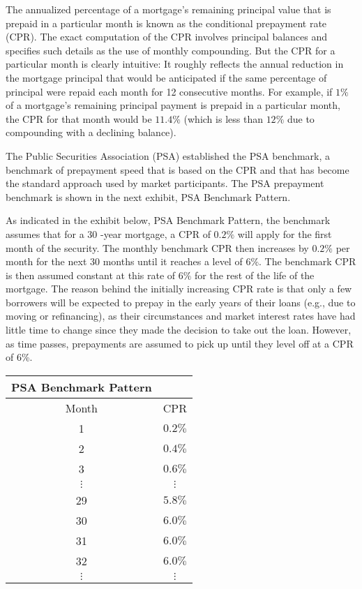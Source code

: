 \documentclass[11pt]{article}
\begin{document}
The annualized percentage of a mortgage's remaining principal value that is prepaid in a particular month is known as the conditional prepayment rate (CPR). The exact computation of the CPR involves principal balances and specifies such details as the use of monthly compounding. But the CPR for a particular month is clearly intuitive: It roughly reflects the annual reduction in the mortgage principal that would be anticipated if the same percentage of principal were repaid each month for 12 consecutive months. For example, if $1 \%$ of a mortgage's remaining principal payment is prepaid in a particular month, the CPR for that month would be $11.4 \%$ (which is less than $12 \%$ due to compounding with a declining balance).

The Public Securities Association (PSA) established the PSA benchmark, a benchmark of prepayment speed that is based on the CPR and that has become the standard approach used by market participants. The PSA prepayment benchmark is shown in the next exhibit, PSA Benchmark Pattern.

As indicated in the exhibit below, PSA Benchmark Pattern, the benchmark assumes that for a 30 -year mortgage, a CPR of $0.2 \%$ will apply for the first month of the security. The monthly benchmark CPR then increases by $0.2 \%$ per month for the next 30 months until it reaches a level of $6 \%$. The benchmark CPR is then assumed constant at this rate of $6 \%$ for the rest of the life of the mortgage. The reason behind the initially increasing CPR rate is that only a few borrowers will be expected to prepay in the early years of their loans (e.g., due to moving or refinancing), as their circumstances and market interest rates have had little time to change since they made the decision to take out the loan. However, as time passes, prepayments are assumed to pick up until they level off at a CPR of 6\%.

\begin{center}
\begin{tabular}{|cc|}
\hline
PSA Benchmark Pattern &  \\
\hline
Month & CPR \\
\hline
1 & $0.2 \%$ \\
2 & $0.4 \%$ \\
3 & $0.6 \%$ \\
$\vdots$ & $\vdots$ \\
29 & $5.8 \%$ \\
30 & $6.0 \%$ \\
31 & $6.0 \%$ \\
32 & $6.0 \%$ \\
$\vdots$ & $\vdots$ \\
\hline
\end{tabular}
\end{center}
\end{document}

